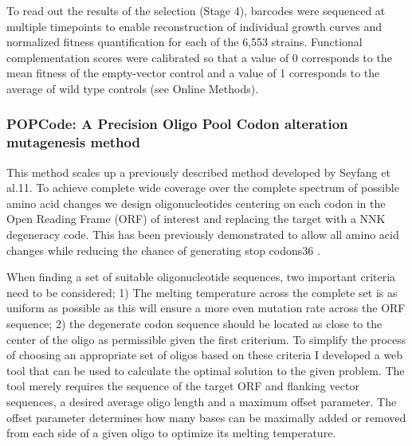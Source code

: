 To read out the results of the selection (Stage 4), barcodes were sequenced at multiple timepoints to enable reconstruction of individual growth curves and normalized fitness quantification for each of the 6,553 strains. Functional complementation scores were calibrated so that a value of 0 corresponds to the mean fitness of the empty-vector control and a value of 1 corresponds to the average of wild type controls (see Online Methods).



\subsubsection{POPCode: A Precision Oligo Pool Codon alteration mutagenesis method}

This method scales up a previously described method developed by Seyfang et al.11. To achieve complete wide coverage over the complete spectrum of possible amino acid changes we design oligonucleotides centering on each codon in the Open Reading Frame (ORF) of interest and replacing the target with a NNK degeneracy code. This has been previously demonstrated to allow all amino acid changes while reducing the chance of generating stop codons36 . 

When finding a set of suitable oligonucleotide sequences, two important criteria need to be considered; 
1) The melting temperature across the complete set is as uniform as possible as this will ensure a more even mutation rate across the ORF sequence; 2) the degenerate codon sequence should be located as close to the center of the oligo as permissible given the first criterium. To simplify the process of choosing an appropriate set of oligos based on these criteria I developed a web tool that can be used to calculate the optimal solution to the given problem. The tool merely requires the sequence of the target ORF and flanking vector sequences, a desired average oligo length and a maximum offset parameter. The offset parameter determines how many bases can be maximally added or removed from each side of a given oligo to optimize its melting temperature. 


